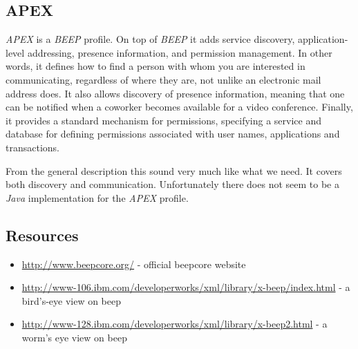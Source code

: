 \subsection{APEX} 
\emph{APEX} is a \emph{BEEP} profile. On top of \emph{BEEP} it adds service discovery, application-level addressing, presence information, and permission management. In other words, it defines how to find a person with whom you are interested in communicating, regardless of where they are, not unlike an electronic mail address does. It also allows discovery of presence information, meaning that one can be notified when a coworker becomes available for a video conference. Finally, it provides a standard mechanism for permissions, specifying a service and database for defining permissions associated with user names, applications and transactions.

From the general description this sound very much like what we need. It covers both discovery and communication. Unfortunately there does not seem to be a \emph{Java} implementation for the \emph{APEX} profile.



\subsection{Resources}
\begin{itemize}
 \item \url{http://www.beepcore.org/} - official beepcore website
 \item \url{http://www-106.ibm.com/developerworks/xml/library/x-beep/index.html} - a bird's-eye view on beep
 \item \url{http://www-128.ibm.com/developerworks/xml/library/x-beep2.html} - a worm's eye view on beep
\end{itemize}
